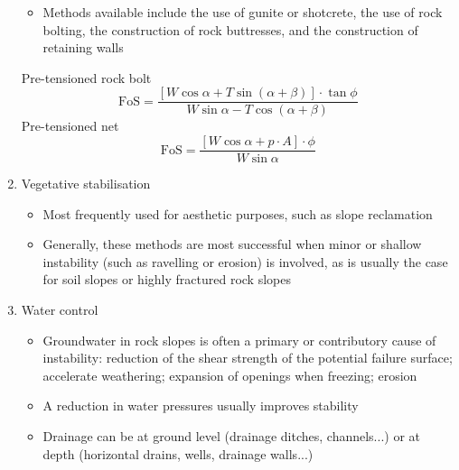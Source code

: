 \documentclass[10pt,landscape,a4paper]{article}
\begin{document}
\begin{multicols}{3}
\begin{enumerate}
\begin{itemize}
			      \item Methods available include the use of gunite or shotcrete, the use of rock bolting, the construction of rock buttresses, and the construction of retaining walls
		      \end{itemize}
		      Pre-tensioned rock bolt
		      \[
			      \text{FoS}=\frac{\left[W\cos\alpha+T\sin(\alpha+\beta)\right]\cdot\tan\phi}{W\sin\alpha-T\cos(\alpha+\beta)}
		      \]
		      Pre-tensioned net
		      \[
			      \text{FoS}=\frac{\left[W\cos\alpha+p\cdot A\right]\cdot\phi}{W\sin\alpha}
		      \]
		\item Vegetative stabilisation
		      \begin{itemize}
			      \item Most frequently used for aesthetic purposes, such as slope reclamation
			      \item Generally, these methods are most successful when minor or shallow instability (such as ravelling or erosion) is involved, as is usually the case for soil slopes or highly fractured rock slopes
		      \end{itemize}
		\item Water control
		      \begin{itemize}
			      \item Groundwater in rock slopes is often a primary or contributory cause of instability: reduction of the shear strength of the potential failure surface; accelerate weathering; expansion of openings when freezing; erosion
			      \item A reduction in water pressures usually improves stability
			      \item Drainage can be at ground level (drainage ditches, channels...) or at depth (horizontal drains, wells, drainage walls...)
		      \end{itemize}
	\end{enumerate}
	
	\newpage
\end{multicols}
\end{document}

